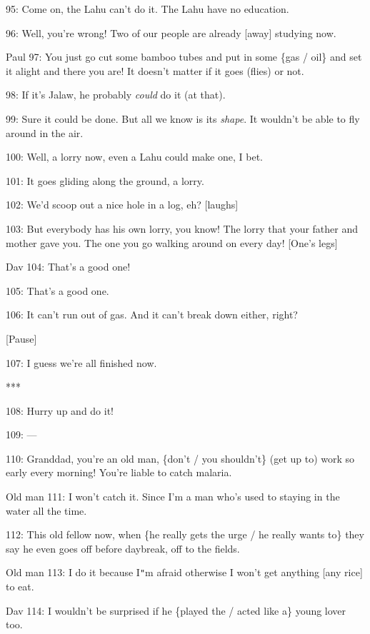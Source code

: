95: Come on, the Lahu can't do it. The Lahu have no education.

96: Well, you're wrong! Two of our people are already [away] studying now.

Paul 97: You just go cut some bamboo tubes and put in some \{gas / oil\} and set
it alight and there you are! It doesn't matter if it goes (flies) or not.

98: If it's Jalaw, he probably \textit{could} do it (at that).

99: Sure it could be done. But all we know is its \textit{shape}. It wouldn't be
able to fly around in the air.

100: Well, a lorry now, even a Lahu could make one, I bet.

101: It goes gliding along the ground, a lorry.

102: We'd scoop out a nice hole in a log, eh? [laughs]

103: But everybody has his own lorry, you know! The lorry that your father and
mother gave you. The one you go walking around on every day! [One's\textbf{ }legs]

Dav 104: That's a good one!

105: That's a good one.

106: It can't run out of gas. And it can't break down either, right?

\begin{center}
[Pause]
\end{center}

\leftskip=0pt
107: I guess we're all finished now.

\begin{center}
***
\end{center}

\leftskip=0pt
108: Hurry up and do it!

109: ---

110: Granddad, you're an old man, \{don't / you shouldn't\} (get up to) work so
early every morning! You're liable to catch malaria.

Old man 111: I won't catch it. Since I'm a man who's used to staying in the water
all the time.

112: This old fellow now, when \{he really gets the urge / he really wants to\}
they say he even goes off before daybreak, off to the fields.

Old man 113: I do it because I\texttt{"}m afraid otherwise I won't get anything
[any rice] to eat.

Dav 114: I wouldn't be surprised if he \{played the / acted like a\} young lover
too.

